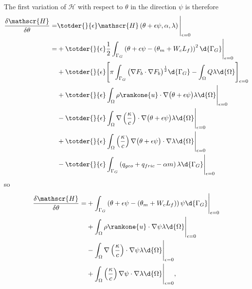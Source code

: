 The first variation of $\mathscr{H}$ with respect to $\theta$ in the direction $\psi$ is therefore
\begin{align*}
 \frac{\delta \mathscr{H}}{\delta \theta} = &\totder{}{\epsilon} \mathscr{H} \left(\theta + \epsilon \psi, \alpha, \lambda \right) \Bigg|_{\epsilon = 0} \\
 = &+ \totder{}{\epsilon} \frac{1}{2} \int_{\Gamma_G} \left( \theta + \epsilon \psi - \left(\theta_m + W_c L_f\right) \right)^2 \d{\Gamma_G} \Bigg|_{\epsilon = 0} \\
  &+ \totder{}{\epsilon} \Bigg[ \pi \int_{\Gamma_G} \big( \nabla F_b \cdot \nabla F_b\big)^{\frac{1}{2}} \d{\Gamma_G} - \int_{\Omega} Q \lambda \d{\Omega} \Bigg]_{\epsilon = 0} \\
  &+ \totder{}{\epsilon} \int_{\Omega} \rho \rankone{u} \cdot \nabla \big( \theta + \epsilon \psi \big) \lambda \d{\Omega} \Bigg|_{\epsilon = 0} \\
  &- \totder{}{\epsilon} \int_{\Omega} \nabla \left( \frac{\kappa}{c} \right) \cdot \nabla \big( \theta + \epsilon \psi \big) \lambda \d{\Omega} \Bigg|_{\epsilon = 0} \\
  &+ \totder{}{\epsilon} \int_{\Omega} \left( \frac{\kappa}{c} \right) \nabla \big( \theta + \epsilon \psi \big) \cdot \nabla \lambda \d{\Omega} \Bigg|_{\epsilon = 0} \\
  &-\totder{}{\epsilon} \int_{\Gamma_G} \left( q_{geo} + q_{fric} - \alpha m \right) \lambda \d{\Gamma_G} \Bigg|_{\epsilon = 0}
\end{align*}
so
\begin{align*}
 \frac{\delta \mathscr{H}}{\delta \theta} = 
 &+ \int_{\Gamma_G} \left( \theta + \epsilon \psi - \left(\theta_m + W_c L_f\right) \right) \psi \d{\Gamma_G} \Bigg|_{\epsilon = 0} \\
  &+ \int_{\Omega} \rho \rankone{u} \cdot \nabla \psi \lambda \d{\Omega} \Bigg|_{\epsilon = 0} \\
  &- \int_{\Omega} \nabla \left( \frac{\kappa}{c} \right) \cdot \nabla \psi \lambda \d{\Omega} \Bigg|_{\epsilon = 0} \\
  &+ \int_{\Omega} \left( \frac{\kappa}{c} \right) \nabla \psi \cdot \nabla \lambda \d{\Omega} \Bigg|_{\epsilon = 0},
\end{align*}
